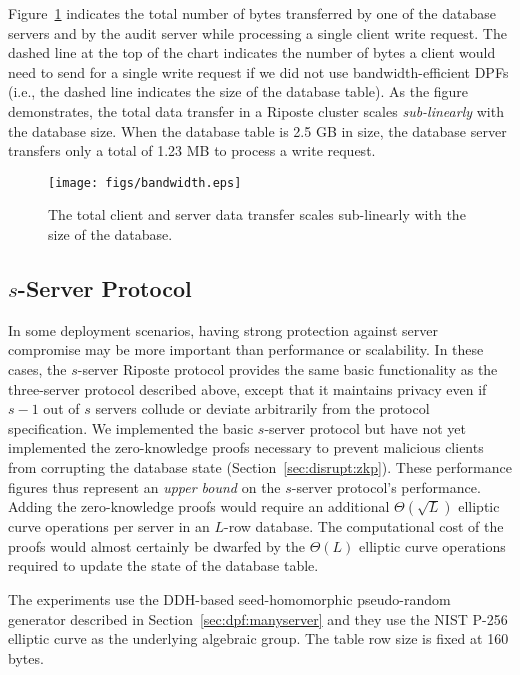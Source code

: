 \documentclass[10pt,twocolumn]{article}
\newcommand{\name}{Riposte\xspace}
\begin{document}
Figure~\ref{fig:bandwidth} indicates the total number of
bytes transferred by one of the database servers and
by the audit server while processing a single client write
request.
The dashed line at the top of the chart indicates the number
of bytes a client would need to send for a single write request
 if we did not use bandwidth-efficient DPFs
(i.e., the dashed line indicates the size of the database table).
As the figure demonstrates,
the total data transfer in a \name cluster
scales {\em sub-linearly} with the database size. 
When the database table is 2.5 GB in size, the database server
transfers only a total of 1.23 MB to process a write request.


\begin{figure}
\centering
\texttt{[image: figs/bandwidth.eps]}
\caption{The total client and server data 
  transfer scales sub-linearly
  with the size of the database.}
\label{fig:bandwidth}
\end{figure}


\subsection{$s$-Server Protocol}

In some deployment scenarios, 
having strong protection against
server compromise may be more important
than performance or scalability.
In these cases, the $s$-server \name protocol 
provides the same basic functionality as the three-server
protocol described above, except that it maintains
privacy even if $s-1$ out of $s$ servers collude or
deviate arbitrarily from the protocol specification.
We implemented the basic $s$-server protocol but have not
yet implemented the zero-knowledge proofs necessary
to prevent malicious clients from corrupting the
database state (Section~\ref{sec:disrupt:zkp}).
These performance figures thus represent an {\em upper bound}
on the $s$-server protocol's performance.
Adding the zero-knowledge proofs 
would require an additional $\Theta(\sqrt{L})$
elliptic curve operations per server in an $L$-row database.
The computational cost of the proofs would almost certainly be dwarfed by the $\Theta(L)$
elliptic curve operations required to update the state of the database table.

The experiments use the DDH-based seed-homomorphic 
pseudo-random generator described
in Section~\ref{sec:dpf:manyserver} and they use the 
NIST P-256 elliptic curve as the underlying algebraic group.
The table row size is fixed at 160 bytes. 
\end{document}
